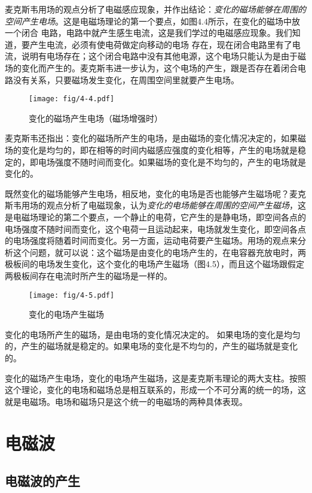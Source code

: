 麦克斯韦用场的观点分析了电磁感应现象，并作出结论：\textit{变化的磁场能够在周围的空间产生电场}。这是电磁场理论的第一个要点，如图4.4所示，在变化的磁场中放一个闭合
电路，电路中就产生感生电流，这是我们学过的电磁感应现象。我们知道，要产生电流，必须有使电荷做定向移动的电场
存在，现在闭合电路里有了电流，说明有电场存在；这个闭合电路中没有其他电源，这个电场只能认为是由于磁场的变化而产生的。麦克斯韦进一步认为，这个电场的产生，跟是否存在着闭合电路没有关系，只要磁场发生变化，在周围空间里就要产生电场。
\begin{figure}[htp]\centering
\texttt{[image: fig/4-4.pdf]}
\caption{变化的磁场产生电场（磁场增强时）}
\end{figure}

麦克斯韦还指出：变化的磁场所产生的电场，是由磁场的变化情况决定的，如果磁场的变化是均匀的，即在相等的时间内磁感应强度的变化相等，产生的电场就是稳定的，即电场强度不随时间而变化。如果磁场的变化是不均匀的，产生的电场就是变化的。

既然变化的磁场能够产生电场，相反地，变化的电场是否也能够产生磁场呢？麦克斯韦用场的观点分析了电磁现象，认为\textit{变化的电场能够在周围的空间产生磁场}，这是电磁场理论的第二个要点，一个静止的电荷，它产生的是静电场，即空间各点的电场强度不随时间而变化，这个电荷一且运动起来，电场就发生变化，即空间各点的电场强度将随着时间而变化。另一方面，运动电荷要产生磁场。用场的观点来分析这个问题，就可以说：这个磁场是由变化的电场产生的，在电容器充放电时，两极板间的电场发生变化，这个变化的电场产生磁场（图4.5），而且这个磁场跟假定两极板间存在电流时所产生的磁场是一样的。
\begin{figure}[htp]\centering
\texttt{[image: fig/4-5.pdf]}
\caption{变化的电场产生磁场}
\end{figure}


变化的电场所产生的磁场，是由电场的变化情况决定的。
如果电场的变化是均匀的，产生的磁场就是稳定的。如果电场的变化是不均匀的，产生的磁场就是变化的。

变化的磁场产生电场，变化的电场产生磁场，这是麦克斯韦理论的两大支柱。按照这个理论，变化的电场和磁场总是相互联系的，形成一个不可分离的统一的场，这就是电磁场。电场和磁场只是这个统一的电磁场的两种具体表现。

\section{电磁波}
\subsection{电磁波的产生}

